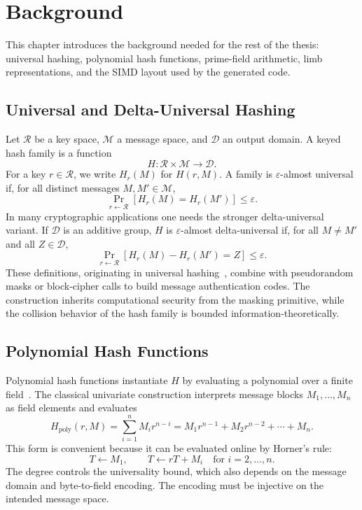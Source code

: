 \chapter{Background}
\label{ch:background}

This chapter introduces the background needed for the rest of the thesis: universal hashing, polynomial hash functions, prime-field arithmetic, limb representations, and the SIMD layout used by the generated code.

\section{Universal and Delta-Universal Hashing}
\label{sec:universal-hashing}

Let \(\mathcal{R}\) be a key space, \(\mathcal{M}\) a message space, and \(\mathcal{D}\) an output domain. A keyed hash family is a function
\[
    H : \mathcal{R} \times \mathcal{M} \rightarrow \mathcal{D}.
\]
For a key \(r \in \mathcal{R}\), we write \(H_r(M)\) for \(H(r,M)\). A family is \(\varepsilon\)-almost universal if, for all distinct messages \(M,M' \in \mathcal{M}\),
\[
    \Pr_{r \leftarrow \mathcal{R}}\left[H_r(M) = H_r(M')\right] \leq \varepsilon.
\]
In many cryptographic applications one needs the stronger delta-universal variant. If \(\mathcal{D}\) is an additive group, \(H\) is \(\varepsilon\)-almost delta-universal if, for all \(M \neq M'\) and all \(Z \in \mathcal{D}\),
\[
    \Pr_{r \leftarrow \mathcal{R}}\left[H_r(M) - H_r(M') = Z\right] \leq \varepsilon.
\]
These definitions, originating in universal hashing~\cite{carter1979universal}, combine with pseudorandom masks or block-cipher calls to build message authentication codes. The construction inherits computational security from the masking primitive, while the collision behavior of the hash family is bounded information-theoretically.

\section{Polynomial Hash Functions}
\label{sec:polynomial-hash-functions}

Polynomial hash functions instantiate \(H\) by evaluating a polynomial over a finite field~\cite{bernstein2007pema}. The classical univariate construction interprets message blocks \(M_1,\ldots,M_n\) as field elements and evaluates
\[
    H_{\mathrm{poly}}(r,M)
        = \sum_{i=1}^{n} M_i r^{n-i}
        = M_1 r^{n-1} + M_2 r^{n-2} + \cdots + M_n.
\]
This form is convenient because it can be evaluated online by Horner's rule:
\[
    T \leftarrow M_1,\qquad
    T \leftarrow rT + M_i \quad \text{for } i=2,\ldots,n.
\]
The degree controls the universality bound, which also depends on the message domain and byte-to-field encoding. The encoding must be injective on the intended message space.

